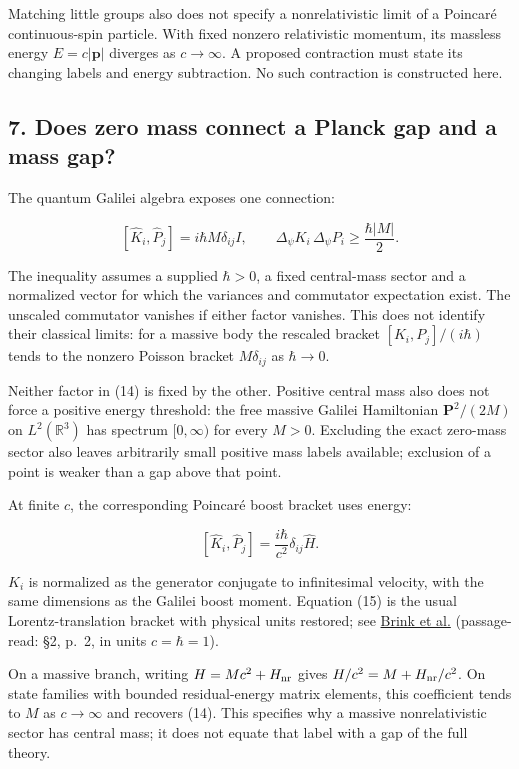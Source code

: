 \documentclass[11pt,a4paper]{article}
\begin{document}
Matching little groups also does not specify a nonrelativistic limit of
a Poincaré continuous-spin particle. With fixed nonzero relativistic
momentum, its massless energy \(E=c|\mathbf p|\) diverges as
\(c\to\infty\). A proposed contraction must state its changing labels
and energy subtraction. No such contraction is constructed here.

\hypertarget{does-zero-mass-connect-a-planck-gap-and-a-mass-gap}{%
\subsection{7. Does zero mass connect a Planck gap and a mass
gap?}\label{does-zero-mass-connect-a-planck-gap-and-a-mass-gap}}

The quantum Galilei algebra exposes one connection:

\[
[\widehat K_i,\widehat P_j]=i\hbar M\delta_{ij}I,
\qquad
\Delta_\psi K_i\,\Delta_\psi P_i\ge\frac{\hbar|M|}{2}. \tag{14}
\]

The inequality assumes a supplied \(\hbar>0\), a fixed central-mass
sector and a normalized vector for which the variances and commutator
expectation exist. The unscaled commutator vanishes if either factor
vanishes. This does not identify their classical limits: for a massive
body the rescaled bracket \([K_i,P_j]/(i\hbar)\) tends to the nonzero
Poisson bracket \(M\delta_{ij}\) as \(\hbar\to0\).

Neither factor in (14) is fixed by the other. Positive central mass also
does not force a positive energy threshold: the free massive Galilei
Hamiltonian \(\mathbf P^2/(2M)\) on \(L^2(\mathbb R^3)\) has spectrum
\([0,\infty)\) for every \(M>0\). Excluding the exact zero-mass sector
also leaves arbitrarily small positive mass labels available; exclusion
of a point is weaker than a gap above that point.

At finite \(c\), the corresponding Poincaré boost bracket uses energy:

\[
[\widehat K_i,\widehat P_j]
=\frac{i\hbar}{c^2}\delta_{ij}\widehat H. \tag{15}
\]

\(K_i\) is normalized as the generator conjugate to infinitesimal
velocity, with the same dimensions as the Galilei boost moment. Equation
(15) is the usual Lorentz-translation bracket with physical units
restored; see \href{https://arxiv.org/pdf/hep-th/0205145v1}{Brink et
al.} (passage-read: §2, p.~2, in units \(c=\hbar=1\)).

On a massive branch, writing \(H=Mc^2+H_{\rm nr}\) gives
\(H/c^2=M+H_{\rm nr}/c^2\). On state families with bounded
residual-energy matrix elements, this coefficient tends to \(M\) as
\(c\to\infty\) and recovers (14). This specifies why a massive
nonrelativistic sector has central mass; it does not equate that label
with a gap of the full theory.
\end{document}
